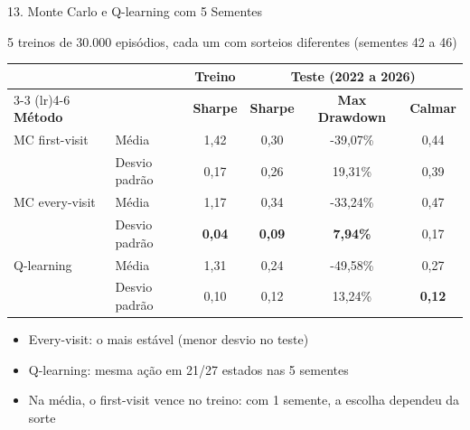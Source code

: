 \documentclass[aspectratio=169,10pt,t]{beamer}
\begin{document}
\begin{frame}{13. Monte Carlo e Q-learning com 5 Sementes}

  \begin{block}{5 treinos de 30.000 episódios, cada um com sorteios diferentes (sementes 42 a 46)}
    \centering\scriptsize
    \setlength{\tabcolsep}{7pt}
    \renewcommand{\arraystretch}{1.05}
    \begin{tabular}{ll c ccc}
      \toprule
      & & \textbf{Treino} & \multicolumn{3}{c}{\textbf{Teste (2022 a 2026)}} \\
      \cmidrule(lr){3-3} \cmidrule(lr){4-6}
      \textbf{Método} & & \textbf{Sharpe} & \textbf{Sharpe} & \textbf{Max Drawdown} & \textbf{Calmar} \\
      \midrule
      MC first-visit & Média         & 1,42   & 0,30   & -39,07\% & 0,44   \\
                     & Desvio padrão & 0,17   & 0,26   & 19,31\%  & 0,39   \\
      \midrule
      MC every-visit & Média         & 1,17            & 0,34            & -33,24\%         & 0,47   \\
                     & Desvio padrão & \textbf{0,04}   & \textbf{0,09}   & \textbf{7,94\%}  & 0,17   \\
      \midrule
      Q-learning     & Média         & 1,31   & 0,24   & -49,58\% & 0,27            \\
                     & Desvio padrão & 0,10   & 0,12   & 13,24\%  & \textbf{0,12}   \\
      \bottomrule
    \end{tabular}
  \end{block}

  \small
  \begin{itemize}\setlength{\itemsep}{2pt}
    \item Every-visit: o mais estável (menor desvio no teste)
    \item Q-learning: mesma ação em 21/27 estados nas 5 sementes
    \item Na média, o first-visit vence no treino: com 1 semente, a escolha dependeu da sorte
  \end{itemize}

\end{frame}

\end{document}
